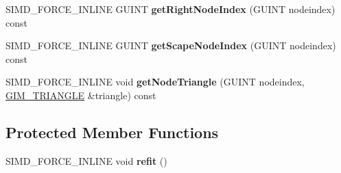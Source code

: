 \begin{DoxyCompactItemize}
\item 
\hypertarget{class_g_i_m___b_o_x___t_r_e_e___t_e_m_p_l_a_t_e___s_e_t_a8ea2896bc8ef6f25e25a5f47a7b88156}{S\+I\+M\+D\+\_\+\+F\+O\+R\+C\+E\+\_\+\+I\+N\+L\+I\+N\+E G\+U\+I\+N\+T {\bfseries get\+Right\+Node\+Index} (G\+U\+I\+N\+T nodeindex) const }\label{class_g_i_m___b_o_x___t_r_e_e___t_e_m_p_l_a_t_e___s_e_t_a8ea2896bc8ef6f25e25a5f47a7b88156}

\item 
\hypertarget{class_g_i_m___b_o_x___t_r_e_e___t_e_m_p_l_a_t_e___s_e_t_a3c88179fb10a4f4f3c66b3e7a73badd2}{S\+I\+M\+D\+\_\+\+F\+O\+R\+C\+E\+\_\+\+I\+N\+L\+I\+N\+E G\+U\+I\+N\+T {\bfseries get\+Scape\+Node\+Index} (G\+U\+I\+N\+T nodeindex) const }\label{class_g_i_m___b_o_x___t_r_e_e___t_e_m_p_l_a_t_e___s_e_t_a3c88179fb10a4f4f3c66b3e7a73badd2}

\item 
\hypertarget{class_g_i_m___b_o_x___t_r_e_e___t_e_m_p_l_a_t_e___s_e_t_a45ef3e7b0b76a4b6be1f83e7f82a2d4b}{S\+I\+M\+D\+\_\+\+F\+O\+R\+C\+E\+\_\+\+I\+N\+L\+I\+N\+E void {\bfseries get\+Node\+Triangle} (G\+U\+I\+N\+T nodeindex, \hyperlink{class_g_i_m___t_r_i_a_n_g_l_e}{G\+I\+M\+\_\+\+T\+R\+I\+A\+N\+G\+L\+E} \&triangle) const }\label{class_g_i_m___b_o_x___t_r_e_e___t_e_m_p_l_a_t_e___s_e_t_a45ef3e7b0b76a4b6be1f83e7f82a2d4b}

\end{DoxyCompactItemize}

\subsection*{Protected Member Functions}
\begin{DoxyCompactItemize}
\item 
\hypertarget{class_g_i_m___b_o_x___t_r_e_e___t_e_m_p_l_a_t_e___s_e_t_ab4d10c875575e2bae32f918ce79b9455}{S\+I\+M\+D\+\_\+\+F\+O\+R\+C\+E\+\_\+\+I\+N\+L\+I\+N\+E void {\bfseries refit} ()}\label{class_g_i_m___b_o_x___t_r_e_e___t_e_m_p_l_a_t_e___s_e_t_ab4d10c875575e2bae32f918ce79b9455}

\end{DoxyCompactItemize}
